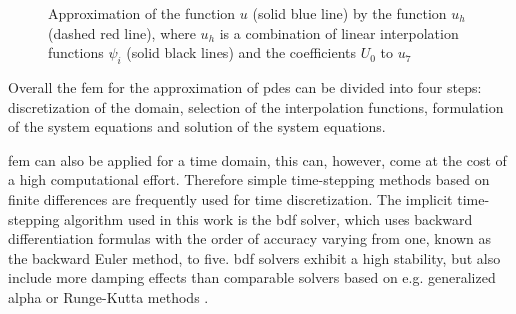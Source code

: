 \begin{figure}[H]
\centering
{}
\caption[Approximation of a function with FEM]{Approximation of the function $u$ (solid blue line) by the function $u_{h}$ (dashed red line), where $u_{h}$ is a combination of linear interpolation functions $\psi_{i}$ (solid black lines) and the coefficients $U_{0}$ to $u_{7}$ \cite{ComsolFEM}
\label{fig:FEM}
}
\end{figure}

Overall the \gls{fem} for the approximation of \glspl{pde} can be divided into four steps: discretization of the domain, selection of the interpolation functions, formulation of the system equations and solution of the system equations. \newpage
 
\Gls{fem} can also be applied for a time domain, this can, however, come at the cost of a high computational effort. Therefore simple time-stepping methods based on finite differences are frequently used for time discretization. The implicit time-stepping algorithm used in this work is the \gls{bdf} solver, which uses backward differentiation formulas with the order of accuracy varying from one, known as the backward Euler method, to five. \gls{bdf} solvers exhibit a high stability, but also include more damping effects than comparable solvers based on e.g. generalized alpha or Runge-Kutta methods \cite{ComsolRefManual}.
\FloatBarrier
